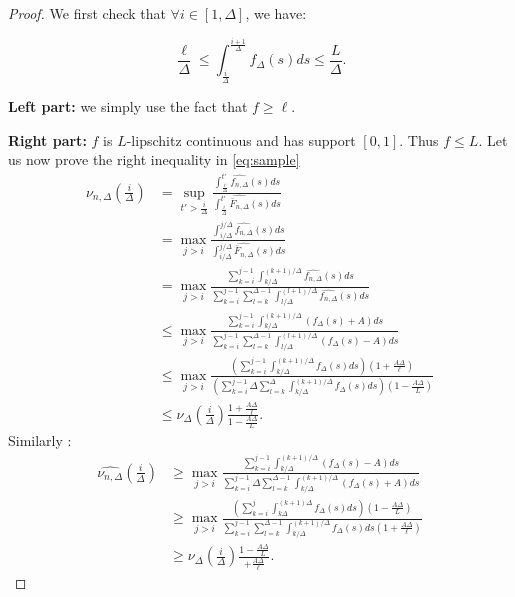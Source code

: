 \documentclass[11pt]{article}
\renewcommand{\geq}{\geqslant}
\renewcommand{\leq}{\leqslant}
\begin{document}
\begin{proof}
    We first check that $\forall i \in [1, \Delta]$, we have:

    $$\frac{\ell}{\Delta} \leq \int_{\frac{i}{\Delta}}^{\frac{i+1}{\Delta}} f_\Delta(s) ds \leq \frac{L}{\Delta}.$$

    \textbf{Left part:} we simply use the fact that $f \geq \ell$.

    \textbf{Right part:} $f$ is $L$-lipschitz continuous and has support $[0,
    1]$. Thus $f \leq L$.
Let us now prove the right inequality in \eqref{eq:sample}
    \begin{align*}
        \widehat{\nu_{n, \Delta}}(\frac{i}{\Delta}) 
        &= \sup_{t' > \frac{i}{\Delta}} \frac{\int_{\frac{i}{\Delta}}^{t'} \widehat{f_{n, \Delta}}(s)
            ds}{\int_{\frac{i}{\Delta}}^{t'}
        \widehat{\bar{F}_{n, \Delta}}(s) ds} \\
        &= \max_{j > i} \frac{\int_{i /\Delta}^{j/\Delta} \widehat{f_{n, \Delta}}(s)
            ds}{\int_{i/\Delta}^{j/\Delta}
        \widehat{\bar{F}_{n, \Delta}}(s) ds} \\
        &= \max_{j > i} \frac{\sum_{k=i}^{j-1} \int_{k/\Delta}^{(k+1)/\Delta}
            \widehat{f_{n, \Delta}}(s)
            ds}{\sum_{k=i}^{j-1}  \sum_{l=k}^{\Delta-1}
                \int_{l/\Delta}^{(l+1)/\Delta}
            \widehat{f_{n, \Delta}}(s) ds} \\
        &\leq \max_{j > i} \frac{\sum_{k=i}^{j-1} \int_{k/\Delta}^{(k+1)/\Delta}
            (f_\Delta(s) +
            A) ds}{\sum_{k=i}^{j-1} \sum_{l=k}^{\Delta-1}
                \int_{l/\Delta}^{(l+1)/\Delta}
        (f_\Delta(s) - A) ds} \\
        &\leq \max_{j > i} \frac{\left( \sum_{k=i}^{j-1} \int_{k/\Delta}^{(k+1)/\Delta}
            f_\Delta(s) ds \right) (1+ \frac{A\Delta}{\ell})}{\left( \sum_{k=i}^{j-1} \Delta
            \sum_{l=k}^{\Delta}
        \int_{k/\Delta}^{(k+1)/\Delta} f_\Delta(s) ds \right)(1 - \frac{A\Delta}{L})} \\
        &\leq \nu_\Delta(\frac{i}{\Delta}) \frac{1 + \frac{A \Delta}{\ell}}{1 -
          \frac{A\Delta}{L}}.
    \end{align*}
  {Similarly : }
        \begin{align*}
        \widehat{\nu_{n, \Delta}}(\frac{i}{\Delta}) 
        &\geq \max_{j > i} \frac{\sum_{k=i}^{j-1} \int_{k/\Delta}^{(k+1)/\Delta}
            (f_\Delta(s) -
            A) ds}{\sum_{k=i}^{j-1} \Delta \sum_{l=k}^{\Delta-1}
                \int_{k/\Delta}^{(k+1)/\Delta}
        (f_\Delta(s) + A) ds} \\
        &\geq \max_{j > i} \frac{\left(\sum_{k=i}^j \int_{k\Delta}^{(k+1)\Delta}
            f_\Delta(s) ds \right)(1
            - \frac{A \Delta}{L})}{\sum_{k=i}^{j-1} 
            \sum_{l=k}^{\Delta-1}
        \int_{k/\Delta}^{(k+1)/\Delta} f_\Delta(s) ds (1 + \frac{A\Delta}{\ell})  } \\
        &\geq \nu_\Delta(\frac{i}{\Delta}) \frac{1 - \frac{A \Delta}{L}}{ + \frac{A \Delta }{\ell}}.
    \end{align*}
\end{proof}
\end{document}
